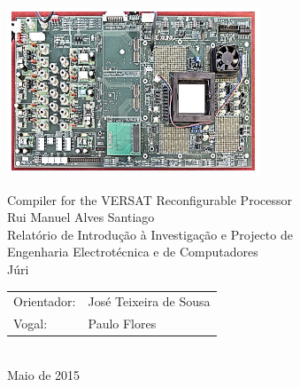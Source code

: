 \begin{center}
%
\vspace{2.5cm}
\includegraphics[height=50mm]{Figures/fpga.jpg}

\vspace{0.8cm}
{\FontLb Compiler for the VERSAT Reconfigurable Processor} \\
\vspace{2.6cm}
{\FontMb Rui Manuel Alves Santiago} \\
\vspace{1.9cm}
{\FontLn Relatório de Introdução à Investigação e Projecto de} \\
\vspace{0.3cm}
{\FontLb Engenharia Electrotécnica e de Computadores} \\
\vspace{1.9cm}
{\FontMb J\'{u}ri} \\
\vspace{0.3cm}
{\FontSn %
\begin{tabular}{ll}
Orientador: & José Teixeira de Sousa \\
Vogal: & Paulo Flores \\
\end{tabular} } \\
\vspace{1.5cm}
{\FontMb Maio de 2015} \\
%
\end{center}

\cleardoublepage

